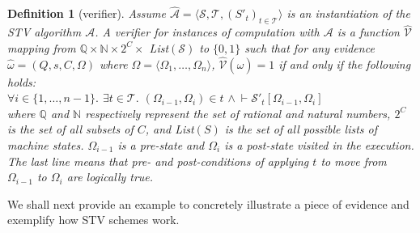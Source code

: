 \documentclass[10pt,conference]{IEEEtran}
\newtheorem{definition}{Definition}
\begin{document}
\begin{definition}[verifier]\label{verifier}
Assume $\hat{\mathcal{A}}= \langle \mathcal{S}, \mathcal{T}, (S'_t)_{t \in \mathcal{T}} \rangle$ is an instantiation of the STV algorithm $\mathcal{A}$. A verifier for instances of computation with $\mathcal{A}$ is a function $\hat{\mathcal{V}}$ mapping from $\mathbb{Q}\times\mathbb{N}\times 2^{C}\times$ \textsf{List}$(\mathcal{S})$ to $\{0,1\}$ such that for any evidence $\hat{\omega} = (Q,s,C,\Omega)$ where $\Omega=\langle\Omega_{1},\dots,\Omega_{n}\rangle$, $\hat{\mathcal{V}}(\hat{\omega}) = 1$ if and only if the following holds:\\
$\forall i\in\{1,\dots,n-1\}.$ 
$\exists t\in\mathcal{T}.$  $(\Omega_{i-1},\Omega_{i})\in t$ $\wedge~\vdash\mathcal{S}'_{t}[\Omega_{i-1},\Omega_{i}]$\\ 
where $\mathbb{Q}$ and $\mathbb{N}$ respectively represent the set of rational and natural numbers, $2^{C}$ is the set of all subsets of $C$, and \textsf{List}$(S)$ is the set of all possible lists of machine states. $\Omega_{i-1}$ is a pre-state and $\Omega_{i}$ is a post-state visited in the execution. The last line means that pre- and post-conditions  of applying $t$ to move from $\Omega_{i-1}$ to $\Omega_{i}$  are logically true. 
\end{definition} 

We shall next provide an example to concretely illustrate a piece of evidence and exemplify how STV schemes work. 

\end{document}
